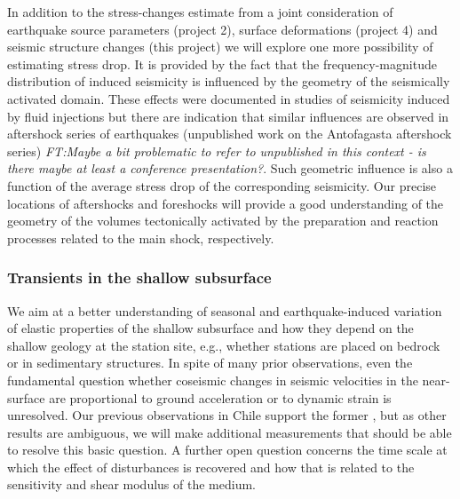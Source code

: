 \documentclass[11pt]{article}
\newcommand{\noteft}[1]{{\it \color{magenta} FT:#1}}
\newcommand{\noteft}[1]{}
\begin{document}
In addition to the stress-changes estimate from a joint consideration of earthquake source parameters (project 2), surface deformations  (project 4) and seismic structure changes (this project) we will explore one more possibility of estimating stress drop. It is provided by the fact that the frequency-magnitude distribution of induced seismicity is influenced by the geometry of the seismically activated domain. These effects were documented in studies of seismicity induced by fluid injections \citep{shapiro:2011,Shapiro2013} but there are indication that similar influences are observed in aftershock series of earthquakes (unpublished work on the Antofagasta aftershock series)\noteft{Maybe a bit problematic to refer to unpublished in this context - is there maybe at least a conference presentation?}. Such geometric influence is also a function of the average stress drop of the corresponding seismicity. Our precise locations of aftershocks and foreshocks will provide a good understanding of the geometry of the volumes tectonically activated by the preparation and reaction processes related to the main shock, respectively. 

\subsubsection{Transients in the shallow subsurface}

We aim at a better understanding of seasonal and earthquake-induced variation of elastic properties of the shallow subsurface and how they depend on the shallow geology at the station site, e.g., whether stations are placed on bedrock or in sedimentary structures.
In spite of many prior observations, even the fundamental question whether coseismic changes in seismic velocities in the near-surface are proportional to ground acceleration or to dynamic strain is unresolved. Our previous observations in Chile support the former \citep{Richter2014}, but as other results are ambiguous, we will make additional measurements that should be able to resolve this basic question. A further open question concerns the time scale at which the effect of disturbances is recovered and how that is related to the sensitivity and shear modulus of the medium.
\end{document}
